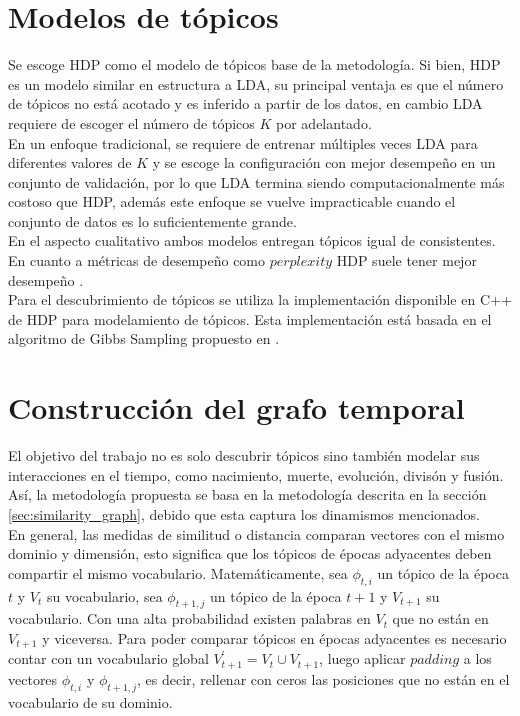 \section{Modelos de tópicos}
\label{sec:model_selected}

Se escoge HDP como el modelo de tópicos base de la metodología. Si bien, HDP es un modelo similar en estructura a LDA, su principal ventaja es que el número de tópicos no está acotado y es inferido a partir de los datos, en cambio LDA requiere de escoger el número de tópicos $K$ por adelantado. \\

En un enfoque tradicional, se requiere de entrenar múltiples veces LDA para diferentes valores de $K$ y se escoge la configuración con mejor desempeño en un conjunto de validación, por lo que LDA termina siendo computacionalmente más costoso que HDP, además este enfoque se vuelve impracticable cuando el conjunto de datos es lo suficientemente grande. \\

En el aspecto cualitativo ambos modelos entregan tópicos igual de consistentes. En cuanto a métricas de desempeño como $\textit{perplexity}$ HDP suele tener mejor desempeño \citep{teh2005sharing}.\\

Para el descubrimiento de tópicos se utiliza la implementación disponible en C++ \citep{HDP} de HDP para modelamiento de tópicos. Esta implementación está basada en el algoritmo de Gibbs Sampling propuesto en \citep{teh2005sharing}.

\section{Construcción del grafo temporal}
\label{sec:build_graph}

El objetivo del trabajo no es solo descubrir tópicos sino también modelar sus interacciones en el tiempo, como nacimiento, muerte, evolución, divisón y fusión.
Así, la metodología propuesta se basa en la metodología descrita en la sección \ref{sec:similarity_graph}, debido que esta captura los dinamismos mencionados.\\

En general, las medidas de similitud o distancia comparan vectores con el mismo dominio y dimensión, esto significa que los tópicos de épocas adyacentes deben compartir el mismo vocabulario. Matemáticamente, sea $\phi_{t, i}$ un tópico de la época $t$ y $V_{t}$ su vocabulario, sea  $\phi_{t+1, j}$ un tópico de la época $t+1$ y $V_{t+1}$ su vocabulario. Con una alta probabilidad existen palabras en $V_{t}$ que no están en $V_{t+1}$ y viceversa. Para poder comparar tópicos en épocas adyacentes  es necesario contar con un vocabulario global $V_{t+1}^{'}=V_{t}\cup V_{t+1}$, luego aplicar $padding$ a los vectores $\phi_{t, i}$ y $\phi_{t+1, j}$, es decir, rellenar con ceros las posiciones que no están en el vocabulario de su dominio.\\

